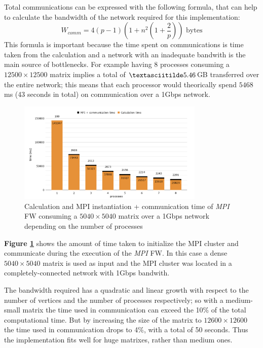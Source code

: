 Total communications can be expressed with the following formula, that can help to calculate the bandwidth of the network required
for this implementation:
\[W_{comm} = 4(p-1)(1 + n^2(1 + \frac{2}{p})) \text{ bytes}\]
This formula is important because the time spent on communications is time taken from the calculation and a network with an inadequate
bandwith is the main source of bottlenecks. For example having 8 processes consuming a $12500 \times 12500$ matrix implies a total of
$\textasciitilde 5.46$GB transferred  over the entire network; this means that each processor would theorically spend $5468$ms (43 seconds in total) on communication over a 1Gbps network.

\begin{figure}[h!]
\centering                                                                        
\includegraphics[width=3.5in]{diagrams/mpi-time}
\captionsetup{justification=centering}                                                                                                                                   
\caption{Calculation and MPI instantiation + communication time of \emph{MPI} FW consuming a $5040\times5040$ matrix over a 1Gbps network depending on the number of processes}
\label{fig:mpi-time}                                                                                                                                                           
\end{figure}

\textbf{Figure \ref*{fig:mpi-time}} shows the amount of time taken to initialize the MPI cluster and communicate during the execution of the \emph{MPI} FW. In this case a dense 
$5040\times5040$ matrix is used as input and the MPI cluster was located in a completely-connected network with 1Gbps bandwith.

The bandwidth required has a quadratic and linear growth with respect to the number of vertices and the number of processes respectively; 
so with a medium-small matrix the time used in communication can exceed the 10\% of the total computational time. 
But by increasing the size of the matrix to $12600\times12600$ the time used in communication drops to 4\%, with a total of 50 seconds. Thus the implementation fits well for huge matrixes, rather than medium ones.


